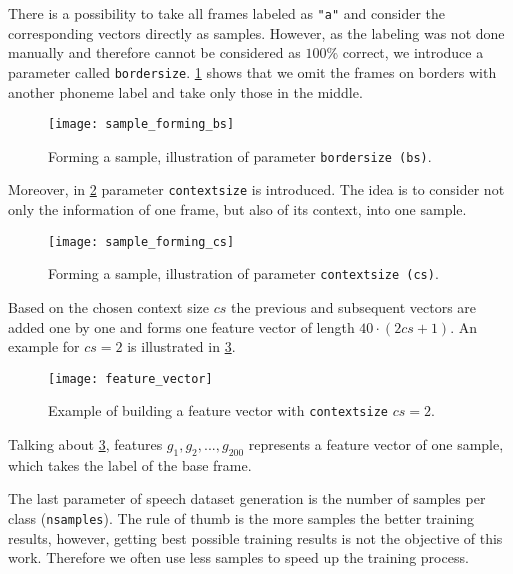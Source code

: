 There is a possibility to take all frames labeled as \texttt{"a"} and consider the corresponding vectors directly as samples. However, as the labeling was not done manually and therefore cannot be considered as $ 100\% $ correct, we introduce a parameter called \texttt{border\textunderscore size}. \cref{fig:methods:sample_forming_bs} shows that we omit the frames on borders with another phoneme label and take only those in the middle.

\begin{figure}[H]
\centering
\texttt{[image: sample\_forming\_bs]}
\caption{Forming a sample, illustration of parameter \texttt{border\textunderscore size (bs)}.}
\label{fig:methods:sample_forming_bs}
\end{figure}

Moreover, in \cref{fig:methods:sample_forming_cs} parameter \texttt{context\textunderscore size} is introduced. The idea is to consider not only the information of one frame, but also of its context, into one sample.

\begin{figure}[H]
\centering
\texttt{[image: sample\_forming\_cs]}
\caption{Forming a sample, illustration of parameter \texttt{context\textunderscore size (cs)}.}
\label{fig:methods:sample_forming_cs}
\end{figure}

Based on the chosen context size $ cs $ the previous and subsequent vectors are added one by one and forms one feature vector of length $ 40 \cdot (2cs+1) $. An example for $ cs = 2 $ is illustrated in \cref{fig:methods:feature_vector}.

\begin{figure}[H]
\centering
\texttt{[image: feature\_vector]}
\caption{Example of building a feature vector with \texttt{context\textunderscore size} $ cs = 2 $.}
\label{fig:methods:feature_vector}
\end{figure}

Talking about \cref{fig:methods:feature_vector}, features $ g_1, g_2, ..., g_{200} $ represents a feature vector of one sample, which takes the label of the base frame.

The last parameter of speech dataset generation is the number of samples per class (\texttt{n\textunderscore samples}). The rule of thumb is the more samples the better training results, however, getting best possible training results is not the objective of this work. Therefore we often use less samples to speed up the training process.

